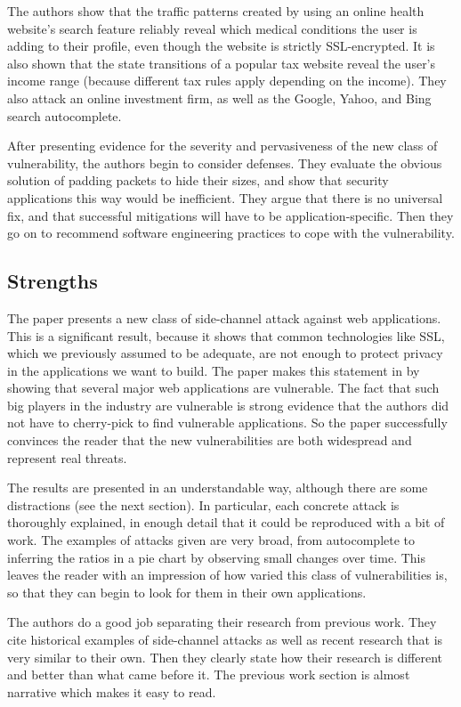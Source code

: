 \documentclass{acm_proc_article-sp}
\begin{document}
The authors show that the traffic patterns created by using an online health
website's search feature reliably reveal which medical conditions the user is
adding to their profile, even though the website is strictly SSL-encrypted. It
is also shown that the state transitions of a popular tax website reveal the
user's income range (because different tax rules apply depending on the income).
They also attack an online investment firm, as well as the Google, Yahoo, and
Bing search autocomplete.

After presenting evidence for the severity and pervasiveness of the new class of
vulnerability, the authors begin to consider defenses. They evaluate the obvious
solution of padding packets to hide their sizes, and show that security
applications this way would be inefficient. They argue that there is no
universal fix, and that successful mitigations will have to be
application-specific. Then they go on to recommend software engineering
practices to cope with the vulnerability.

\subsection{Strengths}

The paper presents a new class of side-channel attack against web applications.
This is a significant result, because it shows that common technologies like
SSL, which we previously assumed to be adequate, are not enough to protect
privacy in the applications we want to build. The paper makes this statement in
by showing that several major web applications are vulnerable. The fact that
such big players in the industry are vulnerable is strong evidence that the
authors did not have to cherry-pick to find vulnerable applications. So the
paper successfully convinces the reader that the new vulnerabilities are both
widespread and represent real threats.

The results are presented in an understandable way, although there are some
distractions (see the next section). In particular, each concrete attack is
thoroughly explained, in enough detail that it could be reproduced with a bit of
work. The examples of attacks given are very broad, from autocomplete to
inferring the ratios in a pie chart by observing small changes over time. This
leaves the reader with an impression of how varied this class of vulnerabilities
is, so that they can begin to look for them in their own applications.

The authors do a good job separating their research from previous work. They
cite historical examples of side-channel attacks as well as recent research that
is very similar to their own. Then they clearly state how their research is
different and better than what came before it. The previous work section is
almost narrative which makes it easy to read.
\end{document}
